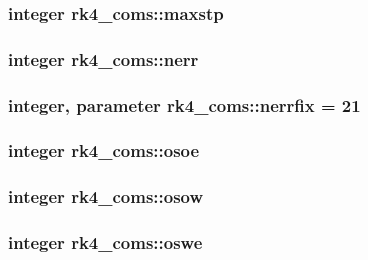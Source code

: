 \subsubsection[{maxstp}]{\setlength{\rightskip}{0pt plus 5cm}integer rk4\+\_\+coms\+::maxstp}\label{namespacerk4__coms_a9fc78b38e070c62f9669f9db9d966784}
\hypertarget{namespacerk4__coms_a8e2fcadf9c0fe34be391e95bd3caa31c}{}
\subsubsection[{nerr}]{\setlength{\rightskip}{0pt plus 5cm}integer rk4\+\_\+coms\+::nerr}\label{namespacerk4__coms_a8e2fcadf9c0fe34be391e95bd3caa31c}
\hypertarget{namespacerk4__coms_a8f0596202fc6dc04e70e600a544ae155}{}
\subsubsection[{nerrfix}]{\setlength{\rightskip}{0pt plus 5cm}integer, parameter rk4\+\_\+coms\+::nerrfix = 21}\label{namespacerk4__coms_a8f0596202fc6dc04e70e600a544ae155}
\hypertarget{namespacerk4__coms_a62d65ed745bfd02b36c79be5861b7cee}{}
\subsubsection[{osoe}]{\setlength{\rightskip}{0pt plus 5cm}integer rk4\+\_\+coms\+::osoe}\label{namespacerk4__coms_a62d65ed745bfd02b36c79be5861b7cee}
\hypertarget{namespacerk4__coms_ac28f34645e6cd2065bc8c458ae43f642}{}
\subsubsection[{osow}]{\setlength{\rightskip}{0pt plus 5cm}integer rk4\+\_\+coms\+::osow}\label{namespacerk4__coms_ac28f34645e6cd2065bc8c458ae43f642}
\hypertarget{namespacerk4__coms_ae9733bb77416a4d137c65ddd1adc5c23}{}
\subsubsection[{oswe}]{\setlength{\rightskip}{0pt plus 5cm}integer rk4\+\_\+coms\+::oswe}\label{namespacerk4__coms_ae9733bb77416a4d137c65ddd1adc5c23}
\hypertarget{namespacerk4__coms_a588b443c0107fd03a7642394a2df5cc9}{}
